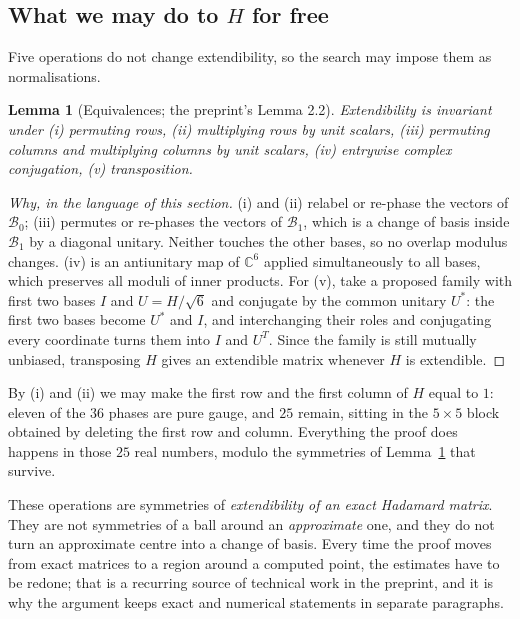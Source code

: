 \documentclass[11pt]{article}
\theoremstyle{definition}
\theoremstyle{plain}
\newtheorem{lemma}[definition]{Lemma}
\theoremstyle{definition}
\newcommand{\C}{\mathbb{C}}
\begin{document}
\subsection{What we may do to $H$ for free}

Five operations do not change extendibility, so the search may impose them as normalisations.

\begin{lemma}[Equivalences; the preprint's Lemma 2.2]\label{lem:equiv}
Extendibility is invariant under (i) permuting rows, (ii) multiplying rows by unit scalars,
(iii) permuting columns and multiplying columns by unit scalars, (iv) entrywise complex conjugation,
(v) transposition.
\end{lemma}

\begin{proof}[Why, in the language of this section]
(i) and (ii) relabel or re-phase the vectors of $\mathcal B_0$; (iii) permutes or re-phases the vectors
of $\mathcal B_1$, which is a change of basis inside $\mathcal B_1$ by a diagonal unitary. Neither
touches the other bases, so no overlap modulus changes. (iv) is an antiunitary map of $\C^6$ applied
simultaneously to all bases, which preserves all moduli of inner products. For (v), take a proposed
family with first two bases $I$ and $U=H/\sqrt6$ and conjugate by the common unitary $U^*$: the first
two bases become $U^*$ and $I$, and interchanging their roles and conjugating every coordinate turns
them into $I$ and $U^T$. Since the family is still mutually unbiased, transposing $H$ gives an
extendible matrix whenever $H$ is extendible.
\end{proof}

By (i) and (ii) we may make the first row and the first column of $H$ equal to $1$: eleven of the
$36$ phases are pure gauge, and $25$ remain, sitting in the $5\times5$ block obtained by deleting the
first row and column. Everything the proof does happens in those $25$ real numbers, modulo the
symmetries of Lemma~\ref{lem:equiv} that survive.

\begin{warnbox}
These operations are symmetries of \emph{extendibility of an exact Hadamard matrix}. They are not
symmetries of a ball around an \emph{approximate} one, and they do not turn an approximate centre
into a change of basis. Every time the proof moves from exact matrices to a region around a computed
point, the estimates have to be redone; that is a recurring source of technical work in the preprint,
and it is why the argument keeps exact and numerical statements in separate paragraphs.
\end{warnbox}
\end{document}

